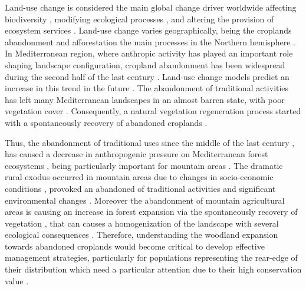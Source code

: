 Land-use change is considered the main global change driver worldwide \autocites{Butchartetal2010GlobalBiodiversity,Winkleretal2021GlobalLand} affecting biodiversity \autocites{Sala2000GlobalBiodiversity}, modifying ecological processes \autocites{Lindenmayeretal2012LandUse}, and altering the provision of ecosystem services \autocites{Hasanetal2020ImpactLand}. Land-use change varies geographically, being the croplands abandonment and afforestation the main processes in the Northern hemisphere \autocites{Winkleretal2021GlobalLand,ReyBenayas2007AbandonmentAgricultural}. In Mediterranean region, where anthropic activity has played an important role shaping landscape configuration, cropland abandonment has been widespread during the second half of the last century \autocites{Piasetal2014ColonizationAbandoned,ValbuenaCarabanaetal2010HistoricalRecent,MartinezFernandezetal2015RecentLand}. Land-use change models predict an increase in this trend in the future \autocites{Rounsevelletal2006CoherentSet,PerpinaCastilloetal2021ModellingAgricultural}. The abandonment of traditional activities has left many Mediterranean landscapes in an almost barren state, with poor vegetation cover \autocites{Sheffer2012ReviewDevelopment, ReyBenayas2007AbandonmentAgricultural}. Consequently, a natural vegetation regeneration process started with a spontaneously recovery of abandoned croplands \autocites{Debusscheetal1999MediterraneanLandscape,PenuelasBoada2003GlobalChangeinduced,AlvarezMartinezetal2014InfluenceLand,Nataleetal2007StudyTree,Piussi2000ExpansionEuropean}. 

Thus, the abandonment of traditional uses since the middle of the last century \autocites{MacDonaldetal2000AgriculturalAbandonment}, has caused a decrease in anthropogenic pressure on Mediterranean forest ecosystems \autocites{ValbuenaCarabanaetal2010HistoricalRecent}, being particularly important for mountain areas \autocites{Nataleetal2007StudyTree, AlvarezMartinezetal2014InfluenceLand,JimenezOlivenciaetal2015MedioSiglo,Piasetal2014ColonizationAbandoned}. The dramatic rural exodus occurred in mountain areas due to changes in socio-economic conditions \autocites{EuropeanEnvironmentAgency2010EuropeEcological}, provoked an abandoned of traditional activities and significant environmental changes \autocites{MacDonaldetal2000AgriculturalAbandonment, Nataleetal2007StudyTree, AlvarezMartinezetal2014InfluenceLand,Piussi2000ExpansionEuropean,Rutherfordetal2008AssessingLanduse,Zimmermannetal2010EffectsLanduse}. Moreover the abandonment of mountain agricultural areas is causing an increase in forest expansion via the spontaneously recovery of vegetation \autocites{Piussi2000ExpansionEuropean, AlvarezMartinezetal2014InfluenceLand}, that can causes a homogenization of the landscape \autocites{Mietkiewiczetal2017LongtermChange} with several ecological consequences \autocites{Zimmermannetal2010EffectsLanduse}. Therefore, understanding the woodland expansion towards abandoned croplands would become critical to develop effective management strategies, particularly for populations representing the rear-edge of their distribution \autocite{HampePetit2005ConservingBiodiversity} which need a particular attention due to their high conservation value \autocite{Fadyetal2016EvolutionbasedApproach}. 

